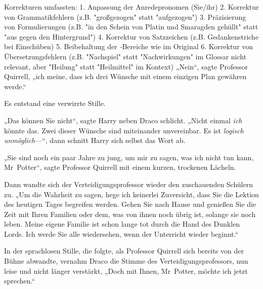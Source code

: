 Korrekturen umfassten:
1. Anpassung der Anredepronomen (Sie/ihr)
2. Korrektur von Grammatikfehlern (z.B. "großgezogen" statt "aufgezogen")
3. Präzisierung von Formulierungen (z.B. "in den Schein von Platin und Smaragden gehüllt" statt "aus gegen den Hintergrund")
4. Korrektur von Satzzeichen (z.B. Gedankenstriche bei Einschüben)
5. Beibehaltung der \emph-Bereiche wie im Original
6. Korrektur von Übersetzungsfehlern (z.B. "Nachspiel" statt "Nachwirkungen" im Glossar nicht relevant, aber "Heilung" statt "Heilmittel" im Kontext)
„Nein“, sagte Professor Quirrell, „ich meine, dass ich drei Wünsche mit einem einzigen Plan gewähren werde.“

Es entstand eine verwirrte Stille.

„Das können Sie nicht“, sagte Harry neben Draco schlicht.
„Nicht einmal \emph{ich} könnte das. Zwei dieser Wünsche sind miteinander unvereinbar. Es ist \emph{logisch unmöglich}—“, dann schnitt Harry sich selbst das Wort ab.

„Sie sind noch ein paar Jahre zu jung, um mir zu sagen, was ich nicht tun kann, Mr~Potter“, sagte Professor Quirrell mit einem kurzen, trockenen Lächeln.

Dann wandte sich der Verteidigungsprofessor wieder den zuschauenden Schülern zu.
„Um die Wahrheit zu sagen, hege ich keinerlei Zuversicht, dass Sie die Lektion des heutigen Tages begreifen werden. Gehen Sie nach Hause und genießen Sie die Zeit mit Ihren Familien oder dem, was von ihnen noch übrig ist, solange sie noch leben. Meine eigene Familie ist schon lange tot durch die Hand des Dunklen Lords. Ich werde Sie alle wiedersehen, wenn der Unterricht wieder beginnt.“

In der sprachlosen Stille, die folgte, als Professor Quirrell sich bereits von der Bühne abwandte, vernahm Draco die Stimme des Verteidigungsprofessors, nun leise und nicht länger verstärkt,
„Doch mit Ihnen, Mr~Potter, möchte ich jetzt sprechen.“